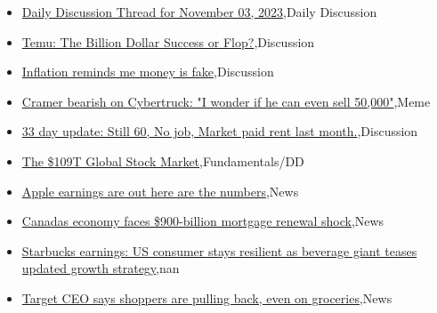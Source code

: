 \documentclass{article}%
\begin{document}
%
\begin{itemize}%
\item%
\href{https://reddit.com/r/wallstreetbets/comments/17mrl8z/daily\_discussion\_thread\_for\_november\_03\_2023/}{Daily Discussion Thread for November 03, 2023},Daily Discussion%
\item%
\href{https://reddit.com/r/wallstreetbets/comments/17mm3wh/temu\_the\_billion\_dollar\_success\_or\_flop/}{Temu: The Billion Dollar Success or Flop?},Discussion%
\item%
\href{https://reddit.com/r/wallstreetbets/comments/17ml0hi/inflation\_reminds\_me\_money\_is\_fake/}{Inflation reminds me money is fake},Discussion%
\item%
\href{https://reddit.com/r/wallstreetbets/comments/17mkkc7/cramer\_bearish\_on\_cybertruck\_i\_wonder\_if\_he\_can/}{Cramer bearish on Cybertruck: "I wonder if he can even sell 50,000"},Meme%
\item%
\href{https://reddit.com/r/wallstreetbets/comments/17mjfhc/33\_day\_update\_still\_60\_no\_job\_market\_paid\_rent/}{33 day update: Still 60, No job, Market paid rent last month.},Discussion%
\item%
\href{https://reddit.com/r/StockMarket/comments/17mrz2a/the\_109t\_global\_stock\_market/}{The \$109T Global Stock Market},Fundamentals/DD%
\item%
\href{https://reddit.com/r/StockMarket/comments/17mcyvx/apple\_earnings\_are\_out\_here\_are\_the\_numbers/}{Apple earnings are out  here are the numbers},News%
\item%
\href{https://reddit.com/r/Economics/comments/17mk60r/canadas\_economy\_faces\_900billion\_mortgage\_renewal/}{Canadas economy faces \$900-billion mortgage renewal shock},News%
\item%
\href{https://reddit.com/r/Economics/comments/17mj05x/starbucks\_earnings\_us\_consumer\_stays\_resilient\_as/}{Starbucks earnings: US consumer stays resilient as beverage giant teases updated growth strategy},nan%
\item%
\href{https://reddit.com/r/Economics/comments/17medfo/target\_ceo\_says\_shoppers\_are\_pulling\_back\_even\_on/}{Target CEO says shoppers are pulling back, even on groceries},News%
\end{itemize}%
\end{document}
